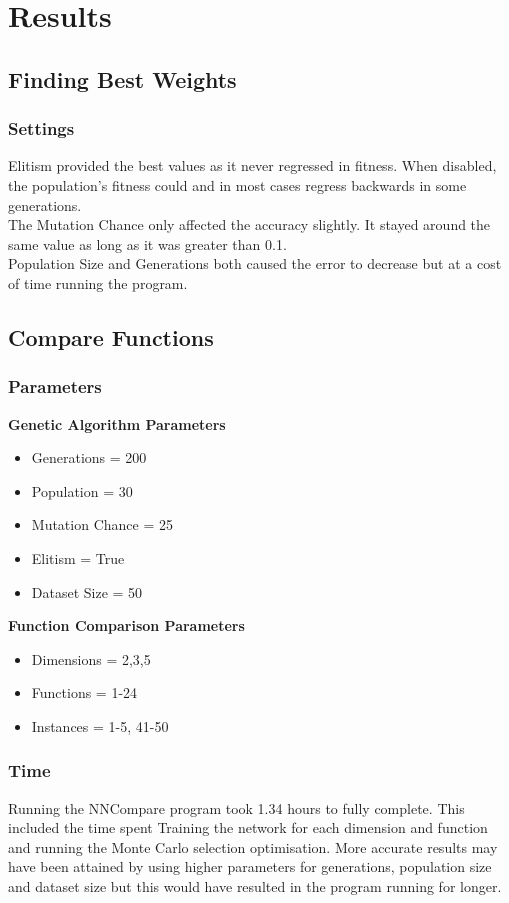 \documentclass[12pt]{article}
\begin{document}
\newpage
\section{Results}
\subsection{Finding Best Weights}
\subsubsection{Settings}
Elitism provided the best values as it never regressed in fitness. When disabled, the population's fitness could and in most cases regress backwards in some generations.\\
The Mutation Chance only affected the accuracy slightly. It stayed around the same value as long as it was greater than 0.1. \\
Population Size and Generations both caused the error to decrease but at a cost of time running the program. 

\subsection{Compare Functions}
\subsubsection{Parameters}
\textbf{Genetic Algorithm Parameters}
\begin{itemize}
	\item Generations = 200
	\item Population = 30
	\item Mutation Chance = 25%
	\item Elitism = True
	\item Dataset Size = 50
\end{itemize}
\textbf{Function Comparison Parameters}
\begin{itemize}
	\item Dimensions = 2,3,5
	\item Functions = 1-24
	\item Instances = 1-5, 41-50
\end{itemize}

\subsubsection{Time}
Running the NNCompare program took 1.34 hours to fully complete. This included the time spent Training the network for each dimension and function and running the Monte Carlo selection optimisation. More accurate results may have been attained by using higher parameters for generations, population size and dataset size but this would have resulted in the program running for longer.
\end{document}
